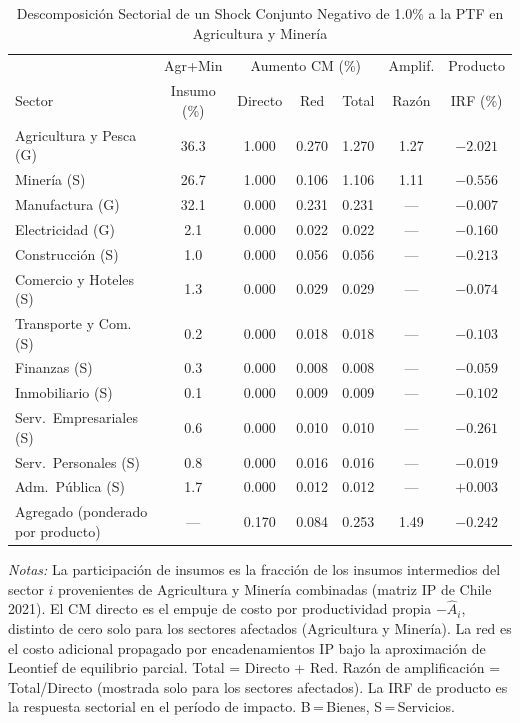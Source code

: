 \begin{table}[htbp]
\centering
\caption{Descomposición Sectorial de un Shock Conjunto Negativo de 1.0\% a la PTF en Agricultura y Minería}
\label{tab:agrmin_decomp}
\begin{threeparttable}
\small
\begin{tabular}{@{}l c c c c c c@{}}
\toprule
 & Agr+Min & \multicolumn{3}{c}{Aumento CM (\%)} & Amplif. & Producto \\
\cmidrule(lr){3-5}
Sector & Insumo (\%) & Directo & Red & Total & Razón & IRF (\%) \\
\midrule
Agricultura y Pesca (G) & 36.3 & 1.000 & 0.270 & 1.270 &  1.27 & $-2.021$ \\
Minería (S) & 26.7 & 1.000 & 0.106 & 1.106 &  1.11 & $-0.556$ \\
Manufactura (G) & 32.1 & 0.000 & 0.231 & 0.231 & --- & $-0.007$ \\
Electricidad (G) &  2.1 & 0.000 & 0.022 & 0.022 & --- & $-0.160$ \\
Construcción (S) &  1.0 & 0.000 & 0.056 & 0.056 & --- & $-0.213$ \\
Comercio y Hoteles (S) &  1.3 & 0.000 & 0.029 & 0.029 & --- & $-0.074$ \\
Transporte y Com. (S) &  0.2 & 0.000 & 0.018 & 0.018 & --- & $-0.103$ \\
Finanzas (S) &  0.3 & 0.000 & 0.008 & 0.008 & --- & $-0.059$ \\
Inmobiliario (S) &  0.1 & 0.000 & 0.009 & 0.009 & --- & $-0.102$ \\
Serv.\ Empresariales (S) &  0.6 & 0.000 & 0.010 & 0.010 & --- & $-0.261$ \\
Serv.\ Personales (S) &  0.8 & 0.000 & 0.016 & 0.016 & --- & $-0.019$ \\
Adm.\ Pública (S) &  1.7 & 0.000 & 0.012 & 0.012 & --- & $+0.003$ \\
\midrule
Agregado (ponderado por producto) & --- & 0.170 & 0.084 & 0.253 &  1.49 & $-0.242$ \\
\bottomrule
\end{tabular}
\begin{tablenotes}[flushleft]
\footnotesize
\item \textit{Notas:} La participación de insumos es la fracción de los insumos intermedios del sector $i$ provenientes de Agricultura y Minería combinadas (matriz IP de Chile 2021). El CM directo es el empuje de costo por productividad propia $-\hat A_i$, distinto de cero solo para los sectores afectados (Agricultura y Minería). La red es el costo adicional propagado por encadenamientos IP bajo la aproximación de Leontief de equilibrio parcial. Total = Directo + Red. Razón de amplificación = Total/Directo (mostrada solo para los sectores afectados). La IRF de producto es la respuesta sectorial en el período de impacto. B\,=\,Bienes, S\,=\,Servicios.
\end{tablenotes}
\end{threeparttable}
\end{table}

